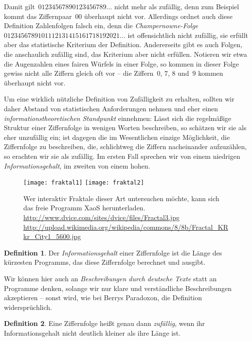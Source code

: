 \documentclass[twoside]{../zirkelblatt1415}
\theoremstyle{definition}
\newtheorem{defn}{Definition}[section]
\theoremstyle{plain}
\theoremstyle{remark}
\begin{document}
Damit gilt~$01234567890123456789\ldots$ nicht mehr als zufällig, denn zum
Beispiel kommt das Ziffernpaar~$00$ überhaupt nicht vor. Allerdings ordnet auch
diese Definition Zahlenfolgen falsch ein, denn die \emph{Champernowne-Folge}
$0123456789101112131415161718192021\ldots$ ist offensichtlich nicht zufällig,
sie erfüllt aber das statistische Kriterium der Definition. Andererseits gibt
es auch Folgen, die anschaulich zufällig sind, das Kriterium aber nicht
erfüllen. Notieren wir etwa die Augenzahlen eines fairen Würfels in einer
Folge, so kommen in dieser Folge gewiss nicht alle Ziffern gleich oft vor --
die Ziffern~$0$, $7$, $8$ und~$9$ kommen überhaupt nicht vor.

Um eine wirklich nützliche Definition von Zufälligkeit zu erhalten, sollten wir
daher Abstand von statistischen Anforderungen nehmen und eher einen
\emph{informationstheoretischen Standpunkt} einnehmen: Lässt sich die
regelmäßige Struktur einer Ziffernfolge in wenigen Worten beschreiben, so
schätzen wir sie als eher unzufällig ein; ist dagegen die im Wesentlichen einzige Möglichkeit,
die Ziffernfolge zu beschreiben, die, schlichtweg die Ziffern nacheinander
aufzuzählen, so erachten wir sie als zufällig. Im ersten Fall sprechen wir von
einem niedrigen \emph{Informationsgehalt}, im zweiten von einem hohen.

\begin{figure}[b]
  \hfill
  \texttt{[image: fraktal1]}\hfill
  \texttt{[image: fraktal2]}\hfill
  \centering
  \caption{\label{fig:fraktale}Wer interaktiv Fraktale dieser Art
  untersuchen möchte, kann sich das freie Programm XaoS herunterladen. \newline
  {\tiny
  \url{http://www.dvice.com/sites/dvice/files/Fractal3.jpg}
  \url{http://upload.wikimedia.org/wikipedia/commons/8/8b/Fractal_KRkr_City1_5600.jpg}}}
\end{figure}

\begin{defn}Der \emph{Informationsgehalt} einer Ziffernfolge ist die Länge des
kürzesten Programms, das diese Ziffernfolge berechnet und ausgibt.\end{defn}

Wir können hier auch an \emph{Beschreibungen durch deutsche Texte} statt an
Programme denken, solange wir nur klare und verständliche Beschreibungen
akzeptieren -- sonst wird, wie bei Berrys Paradoxon, die Definition
widersprüchlich.

\begin{defn}Eine Ziffernfolge heißt genau dann \emph{zufällig}, wenn ihr
Informationsgehalt nicht deutlich kleiner als ihre Länge ist.\end{defn}
\end{document}
